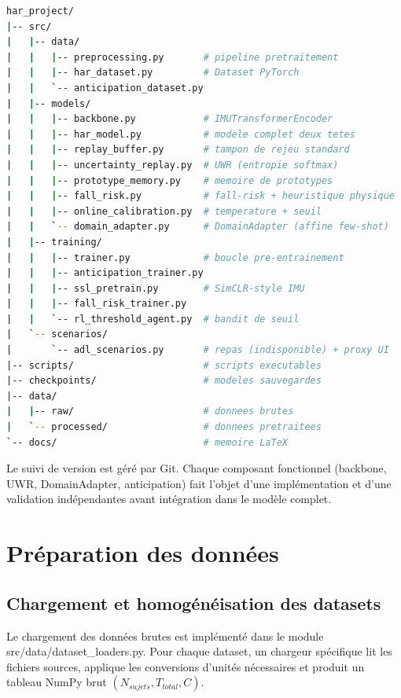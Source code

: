 \documentclass[a4paper,12pt]{report}
\begin{document}
\begin{lstlisting}[language=bash,caption={Structure du projet \texttt{har\_project/}},label=lst:project_tree]
har_project/
|-- src/
|   |-- data/
|   |   |-- preprocessing.py       # pipeline pretraitement
|   |   |-- har_dataset.py         # Dataset PyTorch
|   |   `-- anticipation_dataset.py
|   |-- models/
|   |   |-- backbone.py            # IMUTransformerEncoder
|   |   |-- har_model.py           # modele complet deux tetes
|   |   |-- replay_buffer.py       # tampon de rejeu standard
|   |   |-- uncertainty_replay.py  # UWR (entropie softmax)
|   |   |-- prototype_memory.py    # memoire de prototypes
|   |   |-- fall_risk.py           # fall-risk + heuristique physique
|   |   |-- online_calibration.py  # temperature + seuil
|   |   `-- domain_adapter.py      # DomainAdapter (affine few-shot)
|   |-- training/
|   |   |-- trainer.py             # boucle pre-entrainement
|   |   |-- anticipation_trainer.py
|   |   |-- ssl_pretrain.py        # SimCLR-style IMU
|   |   |-- fall_risk_trainer.py
|   |   `-- rl_threshold_agent.py  # bandit de seuil
|   `-- scenarios/
|       `-- adl_scenarios.py       # repas (indisponible) + proxy UI
|-- scripts/                       # scripts executables
|-- checkpoints/                   # modeles sauvegardes
|-- data/
|   |-- raw/                       # donnees brutes
|   `-- processed/                 # donnees pretraitees
`-- docs/                          # memoire LaTeX
\end{lstlisting}

Le suivi de version est géré par Git. Chaque composant fonctionnel (backbone, UWR, DomainAdapter, anticipation) fait l'objet d'une implémentation et d'une validation indépendantes avant intégration dans le modèle complet.

\section{Préparation des données}

\subsection{Chargement et homogénéisation des datasets}

Le chargement des données brutes est implémenté dans le module src/data/dataset\_loaders.py. Pour chaque dataset, un chargeur spécifique lit les fichiers sources, applique les conversions d'unités nécessaires et produit un tableau NumPy brut $(N_{sujets}, T_{total}, C)$.
\end{document}
